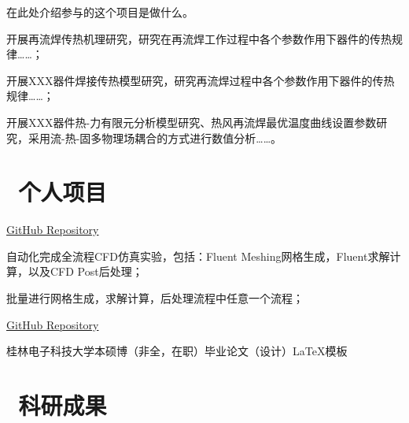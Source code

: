 \documentclass[a4paper,11pt]{ctexart}
\begin{document}
  {在此处介绍参与的这个项目是做什么。}
  \resumeItemListStart
    \item 开展再流焊传热机理研究，研究在再流焊工作过程中各个参数作用下器件的传热规律……；
    \item 开展XXX器件焊接传热模型研究，研究再流焊过程中各个参数作用下器件的传热规律……；
    \item 开展XXX器件热-力有限元分析模型研究、热风再流焊最优温度曲线设置参数研究，采用流-热-固多物理场耦合的方式进行数值分析……。
  \resumeItemListEnd

\resumeSubHeadingListEnd
\vspace{-6.5mm}





\section{\texorpdfstring{\faCode\,}{} 个人项目}

\resumeSubHeadingListStart

  {\href{https://github.com/YanMing-lxb/YM-CFD-Automatic-Simulation-Software}{\faGithub\enspace GitHub Repository}}
  \resumeItemListStart
  \item 自动化完成全流程CFD仿真实验，包括：Fluent Meshing网格生成，Fluent求解计算，以及CFD Post后处理；
  \item 批量进行网格生成，求解计算，后处理流程中任意一个流程；
  \resumeItemListEnd
  \vspace{-1mm}

  {\href{https://github.com/GUET-TeX-Users-Group/GUET_Thesis_LaTeX}{\faGithub\enspace GitHub Repository}} 
  \resumeItemListStart
    \item {桂林电子科技大学本硕博（非全，在职）毕业论文（设计）\LaTeX 模板}
  \resumeItemListEnd

\resumeSubHeadingListEnd
\vspace{-7.5mm}



\section{\texorpdfstring{\faGavel\,}{} 科研成果}
\end{document}
